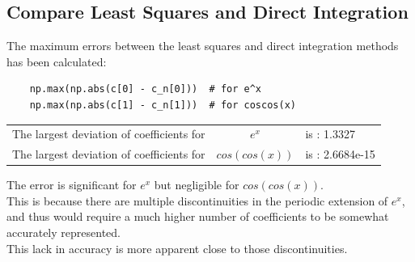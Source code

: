 \documentclass[12pt, a4paper]{article}
\begin{document}
\subsection{Compare Least Squares and Direct Integration}
The maximum errors between the least squares and direct integration methods has been calculated:
\begin{lstlisting}
    np.max(np.abs(c[0] - c_n[0]))  # for e^x
    np.max(np.abs(c[1] - c_n[1]))  # for coscos(x)
\end{lstlisting}

\begin{tabular}{lcl}
    The largest deviation of coefficients for & $e^x$         & is : 1.3327     \\
    The largest deviation of coefficients for & $cos(cos(x))$ & is : 2.6684e-15
\end{tabular}
\medskip

The error is significant for $e^x$ but negligible for $cos(cos(x))$. \\
This is because there are multiple discontinuities in the periodic extension of $e^x$, and thus
would require a much higher number of coefficients to be somewhat accurately represented. \\
This lack in accuracy is more apparent close to those discontinuities.
\end{document}
